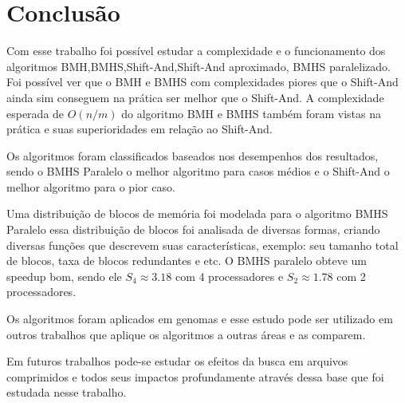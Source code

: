 \documentclass[11pt]{article}
\begin{document}
\section{Conclusão}
\label{sec:org39b1144}

Com esse trabalho foi possível estudar a complexidade e o funcionamento dos algoritmos BMH,BMHS,Shift-And,Shift-And aproximado, BMHS paralelizado. Foi possível ver que o BMH e BMHS com complexidades piores que o Shift-And ainda sim conseguem na prática ser melhor que o Shift-And. A complexidade esperada de \(O(n/m)\) do algoritmo BMH e BMHS também foram vistas na prática e suas superioridades em relação ao Shift-And.

Os algoritmos foram classificados baseados nos desempenhos dos resultados, sendo o BMHS Paralelo o melhor algoritmo para casos médios e o Shift-And o melhor algoritmo para o pior caso.

Uma distribuição de blocos de memória foi modelada para o algoritmo BMHS Paralelo essa distribuição de blocos foi analisada de diversas formas, criando diversas funções que descrevem suas características, exemplo: seu tamanho total de blocos, taxa de blocos redundantes e etc. O BMHS paralelo obteve um speedup bom, sendo ele \(S_{4}\approx 3.18\) com 4 processadores e \(S_{2}\approx 1.78\) com 2 processadores.

Os algoritmos foram aplicados em genomas e esse estudo pode ser utilizado em outros trabalhos que aplique os algoritmos a outras áreas e as comparem.

Em futuros trabalhos pode-se estudar os efeitos da busca em arquivos comprimidos e todos seus impactos profundamente através dessa base que foi estudada nesse trabalho.



\end{document}
